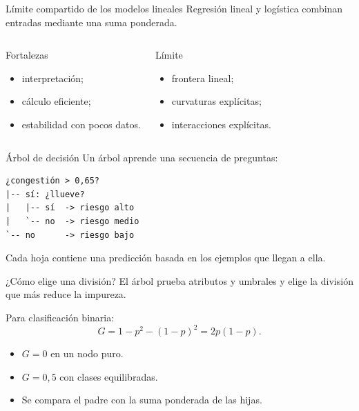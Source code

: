 \documentclass[aspectratio=169,10pt]{beamer}
\begin{document}
\begin{frame}{Límite compartido de los modelos lineales}
  \small
  Regresión lineal y logística combinan entradas mediante una suma ponderada.
  \begin{columns}[T]
    \begin{block}{Fortalezas}\begin{itemize}\item interpretación;\item cálculo eficiente;\item estabilidad con pocos datos.\end{itemize}\end{block}
    \begin{alertblock}{Límite}\begin{itemize}\item frontera lineal;\item curvaturas explícitas;\item interacciones explícitas.\end{itemize}\end{alertblock}
  \end{columns}
\end{frame}

\begin{frame}[fragile]{Árbol de decisión}
  \small Un árbol aprende una secuencia de preguntas:
\begin{verbatim}
¿congestión > 0,65?
|-- sí: ¿llueve?
|   |-- sí  -> riesgo alto
|   `-- no  -> riesgo medio
`-- no      -> riesgo bajo
\end{verbatim}
  Cada hoja contiene una predicción basada en los ejemplos que llegan a ella.
\end{frame}

\begin{frame}{¿Cómo elige una división?}
  \small
  El árbol prueba atributos y umbrales y elige la división que más reduce la impureza.

  Para clasificación binaria:
  \[G=1-p^2-(1-p)^2=2p(1-p).\]
  \begin{itemize}
    \item $G=0$ en un nodo puro.
    \item $G=0{,}5$ con clases equilibradas.
    \item Se compara el padre con la suma ponderada de las hijas.
  \end{itemize}
\end{frame}
\end{document}
